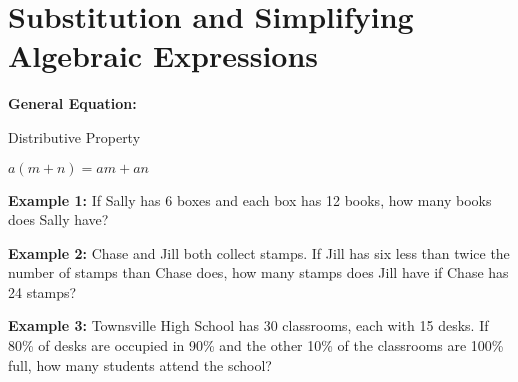 \section[Algebraic Expressions]{Substitution and Simplifying Algebraic Expressions}

\textbf{General Equation:}

\begin{center}
Distributive Property

$a(m+n)=am+an$
\end{center}

\vfill
\textbf{Example 1:} If Sally has 6 boxes and each box has 12 books, how many books does Sally have?

\vfill
\textbf{Example 2:} Chase and Jill both collect stamps. If Jill has six less than twice the number of stamps than Chase does, how many stamps does Jill have if Chase has 24 stamps?

\vfill
\textbf{Example 3:} Townsville High School has 30 classrooms, each with 15 desks. If 80\% of desks are occupied in 90\% and the other 10\% of the classrooms are 100\% full, how many students attend the school?

